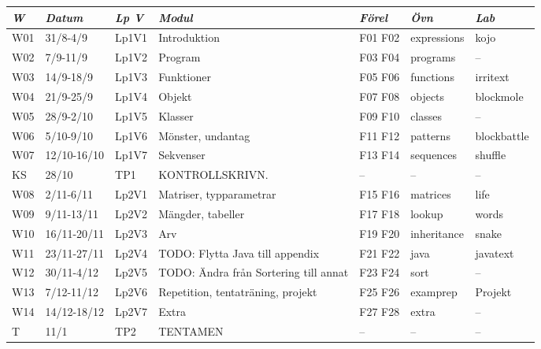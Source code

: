 \begin{tabular}{l|l|l|l|l|l|l}
\textit{W} & \textit{Datum} & \textit{Lp V} & \textit{Modul} & \textit{Förel} & \textit{Övn} & \textit{Lab} \\ \hline \hline
W01 & 31/8-4/9 & Lp1V1 & Introduktion & F01 F02 & expressions & kojo \\
W02 & 7/9-11/9 & Lp1V2 & Program & F03 F04 & programs & -- \\
W03 & 14/9-18/9 & Lp1V3 & Funktioner & F05 F06 & functions & irritext \\
W04 & 21/9-25/9 & Lp1V4 & Objekt & F07 F08 & objects & blockmole \\
W05 & 28/9-2/10 & Lp1V5 & Klasser & F09 F10 & classes & -- \\
W06 & 5/10-9/10 & Lp1V6 & Mönster, undantag & F11 F12 & patterns & blockbattle \\
W07 & 12/10-16/10 & Lp1V7 & Sekvenser & F13 F14 & sequences & shuffle \\
KS & 28/10 & TP1 & KONTROLLSKRIVN. & -- & -- & -- \\
W08 & 2/11-6/11 & Lp2V1 & Matriser, typparametrar & F15 F16 & matrices & life \\
W09 & 9/11-13/11 & Lp2V2 & Mängder, tabeller & F17 F18 & lookup & words \\
W10 & 16/11-20/11 & Lp2V3 & Arv & F19 F20 & inheritance & snake \\
W11 & 23/11-27/11 & Lp2V4 & TODO: Flytta Java till appendix & F21 F22 & java & javatext \\
W12 & 30/11-4/12 & Lp2V5 & TODO: Ändra från Sortering till annat & F23 F24 & sort & -- \\
W13 & 7/12-11/12 & Lp2V6 & Repetition, tentaträning, projekt & F25 F26 & examprep & Projekt \\
W14 & 14/12-18/12 & Lp2V7 & Extra & F27 F28 & extra & -- \\
T & 11/1 & TP2 & TENTAMEN & -- & -- & -- \\
\end{tabular}
